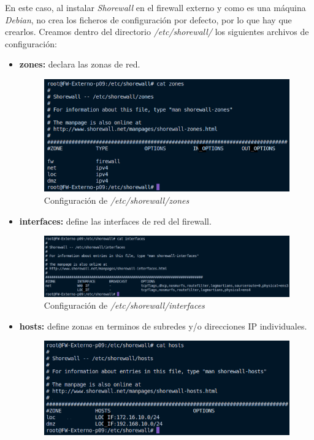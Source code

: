 \documentclass[11pt]{report}
\begin{document}
En este caso, al instalar \emph{Shorewall} en el firewall externo y como es una máquina \emph{Debian}, no crea los ficheros
de configuración por defecto, por lo que hay que crearlos. Creamos dentro del directorio \emph{/etc/shorewall/} los siguientes
archivos de configuración:
\begin{itemize}
  \item \textbf{zones:} declara las zonas de red.
  \begin{figure}[H]
    \centering
    \includegraphics[scale=0.55]{img/zones.png}
    \caption{Configuración de \emph{/etc/shorewall/zones}}
    \label{fig:Configuracion de /etc/shorewall/zones}
  \end{figure}
  \item \textbf{interfaces:} define las interfaces de red del firewall.
  \begin{figure}[H]
    \centering
    \includegraphics[scale=0.55]{img/interfaces.png}
    \caption{Configuración de \emph{/etc/shorewall/interfaces}}
    \label{fig:Configuracion de /etc/shorewall/interfaces}
  \end{figure}
  \item \textbf{hosts:} define zonas en terminos de subredes y/o direcciones IP individuales.
  \begin{figure}[H]
    \centering
    \includegraphics[scale=0.55]{img/hosts.png}

\end{figure}
\end{itemize}
\end{document}
